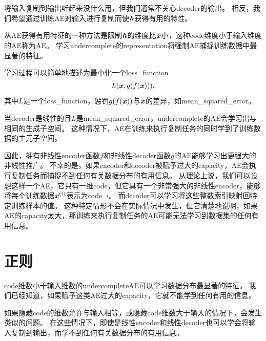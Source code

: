 
\section{}
\label{sec:undercomplete_autoencoders}
将输入复制到输出听起来没什么用，但我们通常不关心\gls{decoder}的输出。
相反，我们希望通过训练\gls{AE}对输入进行复制而使$\boldsymbol{\mathit{h}}$获得有用的特性。


从\gls{AE}获得有用特征的一种方法是限制$\boldsymbol{\mathit{h}}$的维度比$\boldsymbol{\mathit{x}}$小，这种\gls{code}维度小于输入维度的\gls{AE}称为\gls{AE}。
学习\gls{undercomplete}的\gls{representation}将强制\gls{AE}捕捉训练数据中最显著的特征。


学习过程可以简单地描述为最小化一个\gls{loss_function} 
\begin{align}
    L(\boldsymbol{\mathit{x}}, g(f(\boldsymbol{\mathit{x}}))),
\end{align}
其中$L$是一个\gls{loss_function}，惩罚$g(f(\boldsymbol{\mathit{x}}))$与$\boldsymbol{\mathit{x}}$的差异，如\gls{mean_squared_error}。


当\gls{decoder}是线性的且$L$是\gls{mean_squared_error}，\gls{undercomplete}的\gls{AE}会学习出与相同的生成子空间。
这种情况下，\gls{AE}在训练来执行复制任务的同时学到了训练数据的主元子空间。


因此，拥有非线性\gls{encoder}函数$f$和非线性\gls{decoder}函数$g$的\gls{AE}能够学习出更强大的非线性推广。
不幸的是，如果\gls{encoder}和\gls{decoder}被赋予过大的\gls{capacity}，\gls{AE}会执行复制任务而捕捉不到任何有关数据分布的有用信息。
从理论上说，我们可以设想这样一个\gls{AE}，它只有一维\gls{code}，但它具有一个非常强大的非线性\gls{encoder}，能够将每个训练数据$\boldsymbol{\mathit{x}}^{(i)}$表示为\gls{code} $~i$。
而\gls{decoder}可以学习将这些整数索引映射回特定训练样本的值。
这种特定情形不会在实际情况中发生，但它清楚地说明，如果\gls{AE}的\gls{capacity}太大，那训练来执行复制任务的\gls{AE}可能无法学习到数据集的任何有用信息。


\section{正则}
\label{sec:regularized_autoencoders}
\gls{code}维数小于输入维数的\gls{undercomplete}\gls{AE}可以学习数据分布最显著的特征。
我们已经知道，如果赋予这类\gls{AE}过大的\gls{capacity}，它就不能学到任何有用的信息。


如果隐藏\gls{code}的维数允许与输入相等，或隐藏\gls{code}维数大于输入的情况下，会发生类似的问题。
在这些情况下，即使是线性\gls{encoder}和线性\gls{decoder}也可以学会将输入复制到输出，而学不到任何有关数据分布的有用信息。


